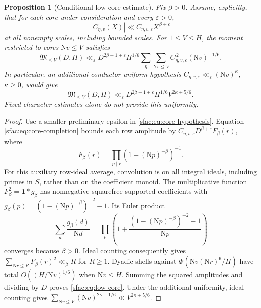 \documentclass[11pt]{article}
\numberwithin{equation}{section}
\newtheorem{proposition}[theorem]{Proposition}
\theoremstyle{definition}
\theoremstyle{remark}
\newcommand{\N}{\mathrm N}
\begin{document}
\begin{proposition}[Conditional low-core estimate]
\label{sfac:prop:core-cutoff}
Fix $\beta>0$.  Assume, explicitly, that for each core under
consideration and every $\varepsilon>0$,
\begin{equation}
 |C_{\eta,v}(X)|\ll
 C_{\eta,v,\varepsilon}X^{\beta+\varepsilon}
 \label{sfac:eq:core-hypothesis}
\end{equation}
at all nonempty scales, including bounded scales.  For $1\le V\le H$,
the moment restricted to cores $\N v\le V$ satisfies
\begin{equation}
 \mathfrak M_{\le V}(D,H)\ll_\varepsilon
 D^{2\beta-1+\varepsilon}H^{1/6}
       \sum_\eta\sum_{\N v\le V}
           C_{\eta,v,\varepsilon}^{\,2}(\N v)^{-1/6}.
 \label{sfac:eq:low-core}
\end{equation}
In particular, an additional conductor-uniform hypothesis
$C_{\eta,v,\varepsilon}\ll_\varepsilon(\N v)^\kappa$, $\kappa\ge0$,
would give
\begin{equation}
 \mathfrak M_{\le V}(D,H)\ll_\varepsilon
   D^{2\beta-1+\varepsilon}H^{1/6}V^{2\kappa+5/6}.
 \label{sfac:eq:low-core-uniform}
\end{equation}
Fixed-character estimates alone do not provide this uniformity.
\end{proposition}

\begin{proof}
Use a smaller preliminary epsilon in \eqref{sfac:eq:core-hypothesis}.
Equation \eqref{sfac:eq:core-completion} bounds each row amplitude by
$C_{\eta,v,\varepsilon}D^{\beta+\varepsilon}F_\beta(r)$, where
\[
 F_\beta(r)=\prod_{p\mid r}(1-(\N p)^{-\beta})^{-1}.
\]
For this auxiliary row-ideal average, convolution is on all integral
ideals, including primes in $S$, rather than on the coefficient monoid.
The multiplicative function $F_\beta^2=\mathbf1*g_\beta$ has
nonnegative squarefree-supported coefficients with
$g_\beta(p)=(1-(\N p)^{-\beta})^{-2}-1$.  Its Euler product
\[
 \sum_d\frac{g_\beta(d)}{\N d}
   =\prod_p\left(1+
    \frac{(1-(\N p)^{-\beta})^{-2}-1}{\N p}\right)
\]
converges because $\beta>0$.  Ideal counting consequently gives
$\sum_{\N r\le R}F_\beta(r)^2\ll_\beta R$ for $R\ge1$.
Dyadic shells against $\Phi(\N v(\N r)^6/H)$ have total
$O((H/\N v)^{1/6})$ when $\N v\le H$.  Summing the squared amplitudes
and dividing by $D$ proves \eqref{sfac:eq:low-core}.
Under the additional uniformity, ideal counting gives
$\sum_{\N v\le V}(\N v)^{2\kappa-1/6}\ll V^{2\kappa+5/6}$.
\end{proof}
\end{document}
